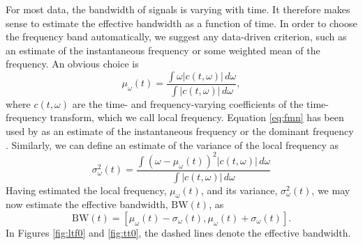 For most data, the bandwidth of signals is varying with time. It therefore makes sense to estimate the effective bandwidth as a function of time. In order to choose the frequency band automatically, we suggest any data-driven criterion, such as an estimate of the instantaneous frequency or some weighted mean of the frequency. 
An obvious choice is 
\begin{equation}
   \mu_\omega(t) = \frac{\displaystyle\int \omega|c(t,\omega)|\,d\omega}{\displaystyle\int|c(t,\omega)|\,d\omega},\label{eq:fmn}
\end{equation}
where $c(t,\omega)$ are the time- and frequency-varying coefficients of the time-frequency transform, which we call local frequency. Equation \ref{eq:fmn} has been used by \cite{lovell93instfreq} as an estimate of the instantaneous frequency \citep{taner79complex,barnes92calculation} or the dominant frequency \citep{liu11time-freq}. Similarly, we can define an estimate of the variance of the local frequency as
\begin{equation}
   \sigma_\omega^2(t) = \frac{\displaystyle\int (\omega-\mu_\omega(t))^2|c(t,\omega)|\,d\omega}{\displaystyle\int |c(t,\omega)|\,d\omega}\label{eq:fvar}
\end{equation}
Having estimated the local frequency, $\mu_\omega(t)$, and its variance, $\sigma_\omega^2(t)$, we may now estimate the effective bandwidth, $\mathrm{BW}(t)$, as 
\begin{equation}
   \mathrm{BW}(t) = [\mu_\omega(t)-\sigma_\omega(t),\mu_\omega(t)+\sigma_\omega(t)].\label{eq:inst_bw}
\end{equation}
In Figures \ref{fig:ltf0} and \ref{fig:tt0}, the dashed lines denote the effective bandwidth. 

